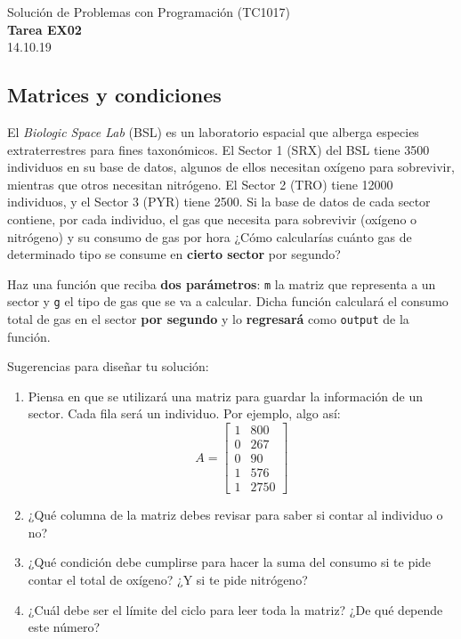 \documentclass[]{book}
\theoremstyle{definition}
\begin{document}
\begin{center}
{\huge Solución de Problemas con Programación (TC1017)}\\[1.5ex]
{\large \textbf{Tarea EX02}\\[1.5ex] %
14.10.19} %
\end{center}

\vspace{0.2 cm}

\subsection*{Matrices y condiciones}

El \textit{Biologic Space Lab} (BSL) es un laboratorio espacial que alberga especies extraterrestres para fines taxonómicos.
El Sector 1 (SRX) del BSL tiene 3500 individuos en su base de datos, algunos de ellos necesitan oxígeno para sobrevivir, mientras que otros necesitan nitrógeno. El Sector 2 (TRO) tiene 12000 individuos, y el Sector 3 (PYR) tiene 2500.
Si la base de datos de cada sector contiene, por cada individuo, el gas que necesita para sobrevivir (oxígeno o nitrógeno) y su consumo de gas por hora ¿Cómo calcularías cuánto gas de determinado tipo se consume en \textbf{cierto sector} por segundo?

Haz una función que reciba \textbf{dos parámetros}: \texttt{m} la matriz que representa a un sector y \texttt{g} el tipo de gas que se va a calcular.
Dicha función calculará el consumo total de gas en el sector \textbf{por segundo} y lo \textbf{regresará} como \texttt{output} de la función.

Sugerencias para diseñar tu solución:
\begin{enumerate}[label=\alph*)]
    \item Piensa en que se utilizará una matriz para guardar la información de un sector. Cada fila será un individuo. Por ejemplo, algo así:
    $$A = \begin{bmatrix}
       1 & 800 \\
       0 & 267 \\
       0 & 90 \\
       1 & 576 \\
       1 & 2750
    \end{bmatrix}$$
    \item ¿Qué columna de la matriz debes revisar para saber si contar al individuo o no?
    \item ¿Qué condición debe cumplirse para hacer la suma del consumo si te pide contar el total de oxígeno? ¿Y si te pide nitrógeno?
    \item ¿Cuál debe ser el límite del ciclo para leer toda la matriz? ¿De qué depende este número?
\end{enumerate}
\end{document}
